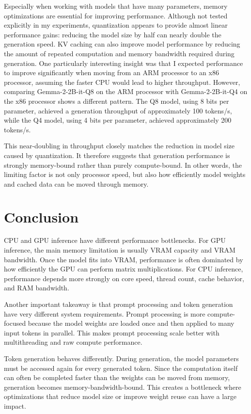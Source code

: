 \documentclass[11pt,a4paper]{article}
\begin{document}
Especially when working with models that have many parameters, memory optimizations are essential for improving performance.
 Although not tested explicitly in my experiments, quantization appears to provide almost linear performance gains: reducing the model size by half can nearly double the generation speed.
KV caching can also improve model performance by reducing the amount of repeated computation and memory bandwidth required during generation.
One particularly interesting insight was that I expected performance to improve significantly when moving from an ARM processor to an x86 processor, assuming the faster CPU would lead to higher throughput.
However, comparing Gemma-2-2B-it-Q8 on the ARM processor with Gemma-2-2B-it-Q4 on the x86 processor shows a different pattern.
The Q8 model, using 8 bits per parameter, achieved a generation throughput of approximately 100 tokens/s, while the Q4 model, using 4 bits per parameter, achieved approximately 200 tokens/s.

This near-doubling in throughput closely matches the reduction in model size caused by quantization.
It therefore suggests that generation performance is strongly memory-bound rather than purely compute-bound.
In other words, the limiting factor is not only processor speed, but also how efficiently model weights and cached data can be moved through memory.

\section{Conclusion}
CPU and GPU inference have different performance bottlenecks.
For GPU inference, the main memory limitation is usually VRAM capacity and VRAM bandwidth.
Once the model fits into VRAM, performance is often dominated by how efficiently the GPU can perform matrix multiplications.
For CPU inference, performance depends more strongly on core speed, thread count, cache behavior, and RAM bandwidth.

Another important takeaway is that prompt processing and token generation have very different system requirements.
Prompt processing is more compute-focused because the model weights are loaded once and then applied to many input tokens in parallel.
This makes prompt processing scale better with multithreading and raw compute performance.

Token generation behaves differently.
During generation, the model parameters must be accessed again for every generated token.
Since the computation itself can often be completed faster than the weights can be moved from memory, generation becomes memory-bandwidth-bound.
This creates a bottleneck where optimizations that reduce model size or improve weight reuse can have a large impact.
\end{document}
